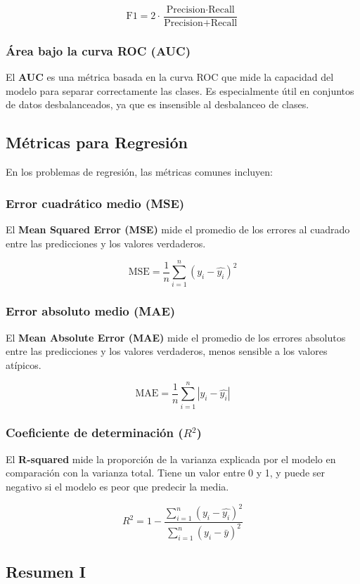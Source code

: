 \documentclass[a4paper, 11pt]{article}
\begin{document}
\[
\text{F1} = 2 \cdot \frac{\text{Precision} \cdot \text{Recall}}{\text{Precision} + \text{Recall}}
\]

\subsubsection{Área bajo la curva ROC (AUC)}
El \textbf{AUC} es una métrica basada en la curva ROC que mide la capacidad del modelo para separar correctamente las clases. Es especialmente útil en conjuntos de datos desbalanceados, ya que es insensible al desbalanceo de clases.

\subsection{Métricas para Regresión}

En los problemas de regresión, las métricas comunes incluyen:

\subsubsection{Error cuadrático medio (MSE)}
El \textbf{Mean Squared Error (MSE)} mide el promedio de los errores al cuadrado entre las predicciones y los valores verdaderos.

\[
\text{MSE} = \frac{1}{n} \sum_{i=1}^{n} (y_i - \hat{y_i})^2
\]

\subsubsection{Error absoluto medio (MAE)}
El \textbf{Mean Absolute Error (MAE)} mide el promedio de los errores absolutos entre las predicciones y los valores verdaderos, menos sensible a los valores atípicos.

\[
\text{MAE} = \frac{1}{n} \sum_{i=1}^{n} |y_i - \hat{y_i}|
\]

\subsubsection{Coeficiente de determinación ($R^2$)}
El \textbf{R-squared} mide la proporción de la varianza explicada por el modelo en comparación con la varianza total. Tiene un valor entre 0 y 1, y puede ser negativo si el modelo es peor que predecir la media.

\[
R^2 = 1 - \frac{\sum_{i=1}^{n} (y_i - \hat{y_i})^2}{\sum_{i=1}^{n} (y_i - \bar{y})^2}
\]
\newpage

\subsection{Resumen I}
\end{document}
